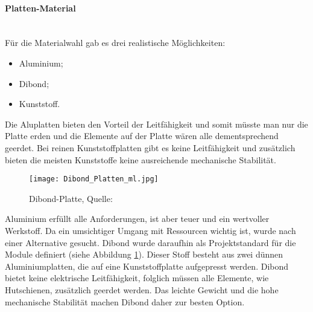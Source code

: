     \paragraph{Platten-Material}\mbox{}\\
    Für die Materialwahl gab es drei realistische Möglichkeiten: 
    \begin{itemize}
        \item Aluminium;
        \item Dibond;
        \item Kunststoff.
    \end{itemize}
    Die Aluplatten bieten den Vorteil der Leitfähigkeit und somit müsste man nur die Platte erden und die Elemente auf der Platte wären alle dementsprechend geerdet. Bei reinen Kunststoffplatten gibt es keine Leitfähigkeit und zusätzlich bieten die meisten Kunststoffe keine ausreichende mechanische Stabilität.\\
    \begin{figure}[h]
        \centering
        \texttt{[image: Dibond\_Platten\_ml.jpg]}
        \caption{Dibond-Platte, Quelle: \cite{Dibond-Platte}}
        \label{fig:Dibond-Platte}
    \end{figure}
    Aluminium erfüllt alle Anforderungen, ist aber teuer und ein wertvoller Werkstoff. Da ein umsichtiger Umgang mit Ressourcen wichtig ist, wurde nach einer Alternative gesucht. Dibond wurde daraufhin als Projektstandard für die Module definiert (siehe Abbildung \ref{fig:Dibond-Platte}). Dieser Stoff besteht aus zwei dünnen Aluminiumplatten, die auf eine Kunststoffplatte aufgepresst werden. Dibond bietet keine elektrische Leitfähigkeit, folglich müssen alle Elemente, wie Hutschienen, zusätzlich geerdet werden. Das leichte Gewicht und die hohe mechanische Stabilität machen Dibond daher zur besten Option.

